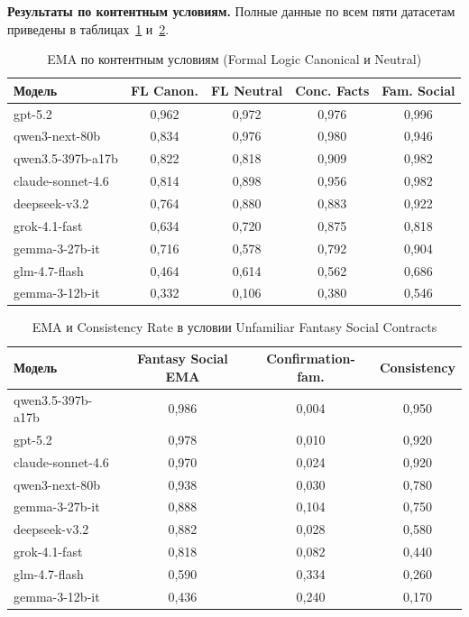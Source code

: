 \textbf{Результаты по контентным условиям.} Полные данные по всем пяти датасетам приведены в таблицах~\ref{tab:wst_content1} и~\ref{tab:wst_content2}.

\begin{table}[h!]
\caption{EMA по контентным условиям (Formal Logic Canonical и Neutral)}
\label{tab:wst_content1}
\centering
\begin{tabular}{|l|c|c|c|c|}
\hline
\textbf{Модель} & \textbf{FL Canon.} & \textbf{FL Neutral} & \textbf{Conc. Facts} & \textbf{Fam. Social} \\
\hline
gpt-5.2                   & 0,962 & 0,972 & 0,976 & 0,996 \\
qwen3-next-80b            & 0,834 & 0,976 & 0,980 & 0,946 \\
qwen3.5-397b-a17b         & 0,822 & 0,818 & 0,909 & 0,982 \\
claude-sonnet-4.6         & 0,814 & 0,898 & 0,956 & 0,982 \\
deepseek-v3.2             & 0,764 & 0,880 & 0,883 & 0,922 \\
grok-4.1-fast             & 0,634 & 0,720 & 0,875 & 0,818 \\
gemma-3-27b-it            & 0,716 & 0,578 & 0,792 & 0,904 \\
glm-4.7-flash             & 0,464 & 0,614 & 0,562 & 0,686 \\
gemma-3-12b-it            & 0,332 & 0,106 & 0,380 & 0,546 \\
\hline
\end{tabular}
\end{table}

\begin{table}[h!]
\caption{EMA и Consistency Rate в условии Unfamiliar Fantasy Social Contracts}
\label{tab:wst_content2}
\centering
\begin{tabular}{|l|c|c|c|}
\hline
\textbf{Модель} & \textbf{Fantasy Social EMA} & \textbf{Confirmation-fam.} & \textbf{Consistency} \\
\hline
qwen3.5-397b-a17b  & 0,986 & 0,004 & 0,950 \\
gpt-5.2            & 0,978 & 0,010 & 0,920 \\
claude-sonnet-4.6  & 0,970 & 0,024 & 0,920 \\
qwen3-next-80b     & 0,938 & 0,030 & 0,780 \\
gemma-3-27b-it     & 0,888 & 0,104 & 0,750 \\
deepseek-v3.2      & 0,882 & 0,028 & 0,580 \\
grok-4.1-fast      & 0,818 & 0,082 & 0,440 \\
glm-4.7-flash      & 0,590 & 0,334 & 0,260 \\
gemma-3-12b-it     & 0,436 & 0,240 & 0,170 \\
\hline
\end{tabular}
\end{table}

